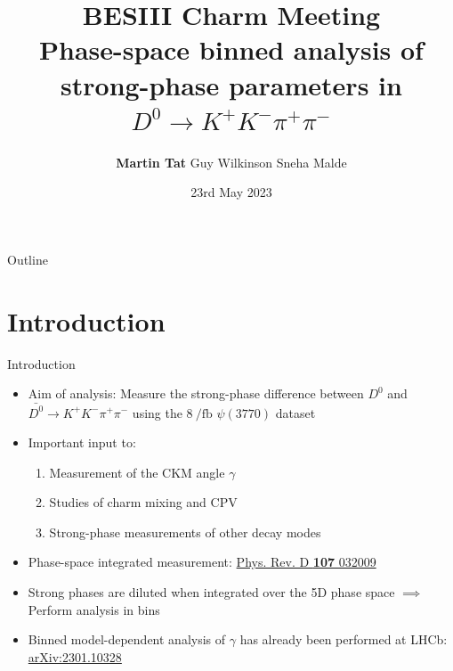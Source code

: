 \documentclass{beamer}
\title[$D^0\to K^+K^-\pi^+\pi^-$]{BESIII Charm Meeting \\Phase-space binned analysis of strong-phase parameters in $D^0\to K^+K^-\pi^+\pi^-$}
\author[Martin Tat]{\textbf{Martin Tat} \hspace{0.54em} Guy Wilkinson \hspace{0.54em} Sneha Malde}
\institute{University of Oxford}
\date{23rd May 2023}
\begin{document}
\begin{frame}
  \titlepage
\end{frame}

\begin{frame}{Outline}
  \tableofcontents
\end{frame}

\section{Introduction}
\begin{frame}{Introduction}
  \begin{itemize}
    \setlength\itemsep{1.0em}
    \item{Aim of analysis: Measure the strong-phase difference between $D^0$ and $\bar{D^0}\to K^+K^-\pi^+\pi^-$ using the $\SI{8}{\per\femto\barn}$ $\psi(3770)$ dataset}
    \item{Important input to:}
    \begin{enumerate}
      \setlength\itemsep{0.1em}
      \item{Measurement of the CKM angle $\gamma$}
      \item{Studies of charm mixing and CPV}
      \item{Strong-phase measurements of other decay modes}
    \end{enumerate}
    \item{Phase-space integrated measurement: \href{https://journals.aps.org/prd/abstract/10.1103/PhysRevD.107.032009}{Phys. Rev. D \textbf{107} 032009}}
    \item{Strong phases are diluted when integrated over the 5D phase space $\implies$ Perform analysis in bins}
    \item{Binned model-dependent analysis of $\gamma$ has already been performed at LHCb: \href{https://arxiv.org/abs/2301.10328}{arXiv:2301.10328}}
  \end{itemize}
\end{frame}
\end{document}
